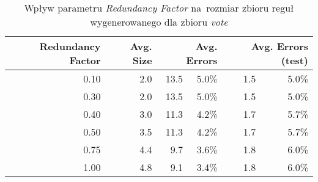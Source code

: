 \begin{table}
\begin{tabular}{|r|r|rr|rr|}
\hline
 Redundancy Factor & 
 Avg. Size & 
 \multicolumn{2}{1|}{Avg. Errors} & 
 \multicolumn{2}{1|}{Avg. Errors (test)} \\
\hline\hline
      0.10 &    2.0 &    13.5 & 5.0\% &    1.5 &  5.0\% \\
      0.30 &    2.0 &    13.5 & 5.0\% &    1.5 &  5.0\% \\
      0.40 &    3.0 &    11.3 & 4.2\% &    1.7 &  5.7\% \\
      0.50 &    3.5 &    11.3 & 4.2\% &    1.7 &  5.7\% \\
      0.75 &    4.4 &     9.7 & 3.6\% &    1.8 &  6.0\% \\
      1.00 &    4.8 &     9.1 & 3.4\% &    1.8 &  6.0\% \\
\hline
\end{tabular}
\caption{Wpływ parametru \emph{Redundancy Factor} na~rozmiar zbioru reguł wygenerowanego dla zbioru \emph{vote}}
\label{p2t2-vote-redundancy-factor}
\end{table}

